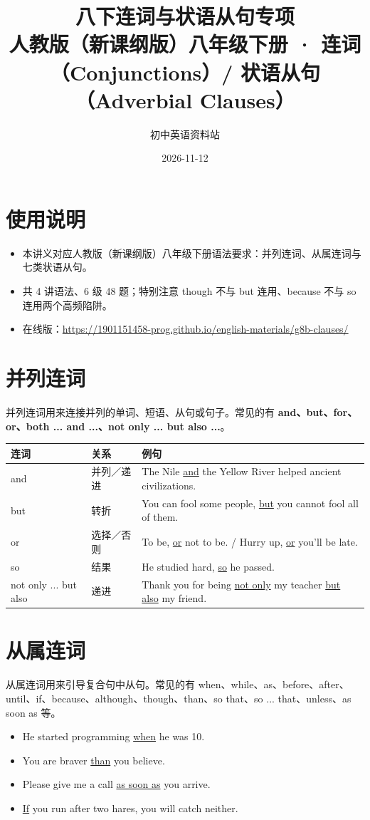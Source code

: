 \documentclass[11pt,a4paper]{ctexart}
\title{\textbf{八下连词与状语从句专项}\\[4pt]
\large 人教版（新课纲版）八年级下册 · 连词（Conjunctions）/ 状语从句（Adverbial Clauses）}
\author{初中英语资料站}
\date{2026-11-12}
\begin{document}
\maketitle

\section*{使用说明}
\begin{itemize}[leftmargin=1.4em]
\item 本讲义对应人教版（新课纲版）八年级下册语法要求：并列连词、从属连词与七类状语从句。
\item 共 4 讲语法、6 级 48 题；特别注意 though 不与 but 连用、because 不与 so 连用两个高频陷阱。
\item 在线版：\url{https://1901151458-prog.github.io/english-materials/g8b-clauses/}
\end{itemize}

\section{并列连词}
并列连词用来连接并列的单词、短语、从句或句子。常见的有 \textbf{and、but、for、or、both ... and ...、not only ... but also ...}。
\begin{center}
\begin{tabular}{p{3.0cm}p{3.2cm}p{8.0cm}}
\hline
\textbf{连词} & \textbf{关系} & \textbf{例句}\\
\hline
and & 并列／递进 & The Nile \underline{and} the Yellow River helped ancient civilizations.\\
but & 转折 & You can fool some people, \underline{but} you cannot fool all of them.\\
or & 选择／否则 & To be, \underline{or} not to be. / Hurry up, \underline{or} you'll be late.\\
so & 结果 & He studied hard, \underline{so} he passed.\\
not only ... but also & 递进 & Thank you for being \underline{not only} my teacher \underline{but also} my friend.\\
\hline
\end{tabular}
\end{center}

\section{从属连词}
从属连词用来引导复合句中从句。常见的有 when、while、as、before、after、until、if、because、although、though、than、so that、so ... that、unless、as soon as 等。
\begin{itemize}[leftmargin=1.4em]
\item He started programming \underline{when} he was 10.
\item You are braver \underline{than} you believe.
\item Please give me a call \underline{as soon as} you arrive.
\item \underline{If} you run after two hares, you will catch neither.
\end{itemize}
\end{document}
